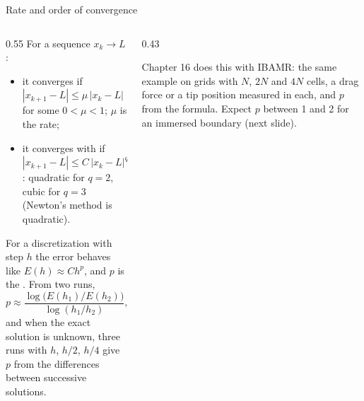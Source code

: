 \documentclass[aspectratio=169,11pt]{beamer}
\begin{document}
\begin{frame}{Rate and order of convergence}
\begin{columns}[T,onlytextwidth]
\begin{column}{0.55\textwidth}
\small For a sequence $x_k \to L$:
\begin{itemize}
  \item it converges  if $|x_{k+1} - L| \le \mu\,|x_k - L|$ for some $0 < \mu < 1$; $\mu$ is the rate;
  \item it converges with  if $|x_{k+1} - L| \le C\,|x_k - L|^q$: quadratic for $q = 2$, cubic for $q = 3$ (Newton's method is quadratic).
\end{itemize}
For a discretization with step $h$ the error behaves like $E(h) \approx C h^p$, and $p$ is the . From two runs,
\[
p \approx \frac{\log\big(E(h_1)/E(h_2)\big)}{\log(h_1/h_2)} ,
\]
and when the exact solution is unknown, three runs with $h$, $h/2$, $h/4$ give $p$ from the differences between successive solutions.
\end{column}
\begin{column}{0.43\textwidth}
\begin{punchbox}
\small Chapter 16 does this with IBAMR: the same example on grids with $N$, $2N$ and $4N$ cells, a drag force or a tip position measured in each, and $p$ from the formula. Expect $p$ between 1 and 2 for an immersed boundary (next slide).
\end{punchbox}
\end{column}
\end{columns}
\end{frame}
\end{document}
